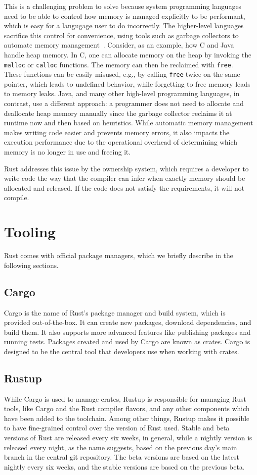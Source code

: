 \documentclass[paper=a4,%
  twoside,%
  BCOR4mm,%
  abstract=true,%
  toc=bibliography,%
  chapterprefix=true,%
  toc=bibliographynumbered,%
  open=right,%
  english,%
  pagesize=pdftex]{scrreprt}
\begin{document}
This is a challenging problem to solve because system programming languages need to be able to control how memory is managed explicitly to be performant, which is easy for a langugage user to do incorrectly. The higher-level languages sacrifice this control for convenience, using tools such as garbage collectors to automate memory management~\cite{Njor2021}. Consider, as an example, how C and Java handle heap memory. In C, one can allocate memory on the heap by invoking the \texttt{malloc} or \texttt{calloc} functions. The memory can then be reclaimed with \texttt{free}. These functions can be easily misused, e.g., by calling \texttt{free} twice on the same pointer, which leads to undefined behavior, while forgetting to free memory leads to memory leaks. Java, and many other high-level programming languages, in contrast, use a different approach: a programmer does not need to allocate and deallocate heap memory manually since the garbage collector reclaims it at runtime now and then based on heuristics. While automatic memory management makes writing code easier and prevents memory errors, it also impacts the execution performance due to the operational overhead of determining which memory is no longer in use and freeing it.

Rust addresses this issue by the ownership system, which requires a developer to write code the way that the compiler can infer when exactly memory should be allocated and released. If the code does not satisfy the requirements, it will not compile.

\section{Tooling}
Rust comes with official package managers, which we briefly describe in the following sections.

\subsection{Cargo}
Cargo is the name of Rust's package manager and build system, which is provided out-of-the-box. It can create new packages, download dependencies, and build them. It also supports more advanced features like publishing packages and running tests. Packages created and used by Cargo are known as crates. Cargo is designed to be the central tool that developers use when working with crates.

\subsection{Rustup}
While Cargo is used to manage crates, Rustup is responsible for managing Rust tools, like Cargo and the Rust compiler flavors, and any other components which have been added to the toolchain. Among other things, Rustup makes it possible to have fine-grained control over the version of Rust used. Stable and beta versions of Rust are released every six weeks, in general, while a nightly version is released every night, as the name suggests, based on the previous day's main branch in the central git repository. The beta versions are based on the latest nightly every six weeks, and the stable versions are based on the previous beta.
\end{document}

